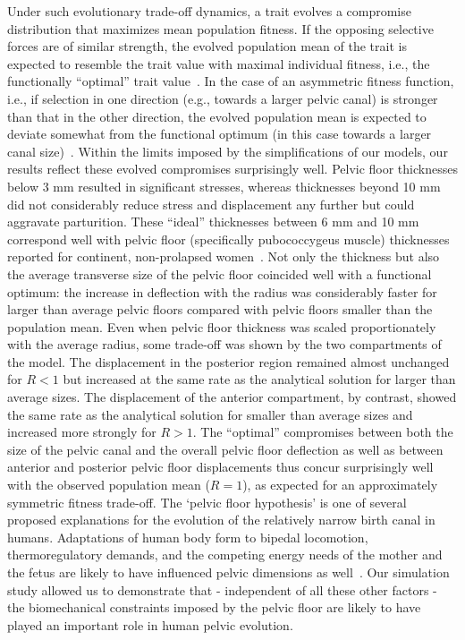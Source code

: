 \documentclass[9pt,twocolumn,twoside]{pnas-new}
\begin{document}
Under such evolutionary trade-off dynamics, a trait evolves a compromise distribution that maximizes mean population fitness. If the opposing selective forces are of similar strength, the evolved population mean of the trait is expected to resemble the trait value with maximal individual fitness, i.e., the functionally ``optimal” trait value~\cite{Li2010-bb}. In the case of an asymmetric fitness function, i.e., if selection in one direction (e.g., towards a larger pelvic canal) is stronger than that in the other direction, the evolved population mean is expected to deviate somewhat from the functional optimum (in this case towards a larger canal size)~\cite{Mitteroecker2016-bm,Arnold2001-aj}. Within the limits imposed by the simplifications of our models, our results reflect these evolved compromises surprisingly well. Pelvic floor thicknesses below 3 mm resulted in significant stresses, whereas thicknesses beyond 10 mm did not considerably reduce stress and displacement any further but could aggravate parturition. These ``ideal” thicknesses between 6 mm and 10 mm correspond well with pelvic floor (specifically pubococcygeus muscle) thicknesses reported for continent, non-prolapsed women~\cite{El_Sayed2017-sy,Mayeur2016-qi,Wijma2007-hh}. Not only the thickness but also the average transverse size of the pelvic floor coincided well with a functional optimum: the increase in deflection with the radius was considerably faster for larger than average pelvic floors compared with pelvic floors smaller than the population mean. Even when pelvic floor thickness was scaled proportionately with the average radius, some trade-off was shown by the two compartments of the model. The displacement in the posterior region remained almost unchanged for $R<1$ but increased at the same rate as the analytical solution for larger than average sizes. The displacement of the anterior compartment, by contrast, showed the same rate as the analytical solution for smaller than average sizes and increased more strongly for $R>1$. The ``optimal” compromises between both the size of the pelvic canal and the overall pelvic floor deflection as well as between anterior and posterior pelvic floor displacements thus concur surprisingly well with the observed population mean ($R=1$), as expected for an approximately symmetric fitness trade-off.
The `pelvic floor hypothesis’ is one of several proposed explanations for the evolution of the relatively narrow birth canal in humans. Adaptations of human body form to bipedal locomotion, thermoregulatory demands, and the competing energy needs of the mother and the fetus are likely to have influenced pelvic dimensions as well~\cite{Dunsworth2012-ip,Grunstra2019-wq,Pavlicev2020-zl,Washburn1960-gm,Ruff1995-mz,Rosenberg2005-tl,Urban2013-ll}. Our simulation study allowed us to demonstrate that - independent of all these other factors - the biomechanical constraints imposed by the pelvic floor are likely to have played an important role in human pelvic evolution.
\end{document}
